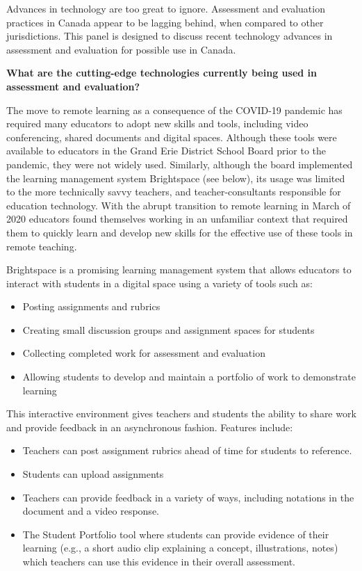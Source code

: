\documentclass[
]{book}
\begin{document}
Advances in technology are too great to ignore. Assessment and evaluation practices in Canada appear to be lagging behind, when compared to other jurisdictions. This panel is designed to discuss recent technology advances in assessment and evaluation for possible use in Canada.

\textbf{What are the cutting-edge technologies currently being used in assessment and evaluation?}

The move to remote learning as a consequence of the COVID-19 pandemic has required many educators to adopt new skills and tools, including video conferencing, shared documents and digital spaces. Although these tools were available to educators in the Grand Erie District School Board prior to the pandemic, they were not widely used. Similarly, although the board implemented the learning management system Brightspace (see below), its usage was limited to the more technically savvy teachers, and teacher-consultants responsible for education technology. With the abrupt transition to remote learning in March of 2020 educators found themselves working in an unfamiliar context that required them to quickly learn and develop new skills for the effective use of these tools in remote teaching.

Brightspace is a promising learning management system that allows educators to interact with students in a digital space using a variety of tools such as:

\begin{itemize}
\item
  Posting assignments and rubrics
\item
  Creating small discussion groups and assignment spaces for students
\item
  Collecting completed work for assessment and evaluation
\item
  Allowing students to develop and maintain a portfolio of work to demonstrate learning
\end{itemize}

This interactive environment gives teachers and students the ability to share work and provide feedback in an asynchronous fashion. Features include:

\begin{itemize}
\item
  Teachers can post assignment rubrics ahead of time for students to reference.
\item
  Students can upload assignments
\item
  Teachers can provide feedback in a variety of ways, including notations in the document and a video response.
\item
  The Student Portfolio tool where students can provide evidence of their learning (e.g., a short audio clip explaining a concept, illustrations, notes) which teachers can use this evidence in their overall assessment.
\end{itemize}
\end{document}
